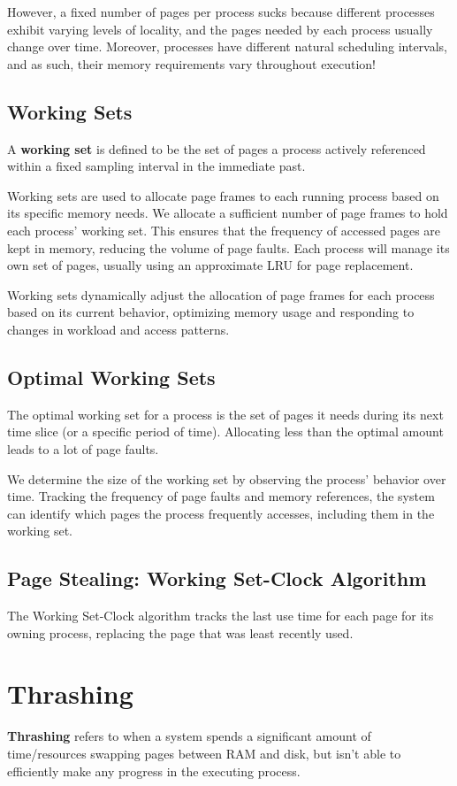 \documentclass{report}
\newcommand{\definitionBegin}[1]{\begin{tcolorbox}[title={Definition: #1}]}
\newcommand{\definitionEnd}{\end{tcolorbox}}
\begin{document}
However, a fixed number of pages per process sucks because different processes exhibit varying
levels of locality, and the pages needed by each process usually change over time. Moreover,
processes have different natural scheduling intervals, and as such, their memory requirements vary
throughout execution!


\subsection{Working Sets}
\definitionBegin{Working Set}
A \textbf{working set} is defined to be the set of pages a process actively referenced within a
fixed sampling interval in the immediate past.
\definitionEnd

Working sets are used to allocate page frames to each running process based on its specific memory
needs. We allocate a sufficient number of page frames to hold each process' working set. This
ensures that the frequency of accessed pages are kept in memory, reducing the volume of page
faults. Each process will manage its own set of pages, usually using an approximate LRU for page
replacement. 

Working sets dynamically adjust the allocation of page frames for each process based on its current
behavior, optimizing memory usage and responding to changes in workload and access patterns.

\subsection*{Optimal Working Sets}
The optimal working set for a process is the set of pages it needs during its next time slice (or a
specific period of time). Allocating less than the optimal amount leads to a lot of page faults.

We determine the size of the working set by observing the process' behavior over time. Tracking the
frequency of page faults and memory references, the system can identify which pages the process
frequently accesses, including them in the working set.

\subsection*{Page Stealing: Working Set-Clock Algorithm}
The Working Set-Clock algorithm tracks the last use time for each page for its owning process,
replacing the page that was least recently used.


\section{Thrashing}
\definitionBegin{Thrashing}
\textbf{Thrashing} refers to when a system spends a significant amount of time/resources swapping
pages between RAM and disk, but isn't able to efficiently make any progress in the executing
process.
\definitionEnd
\end{document}
